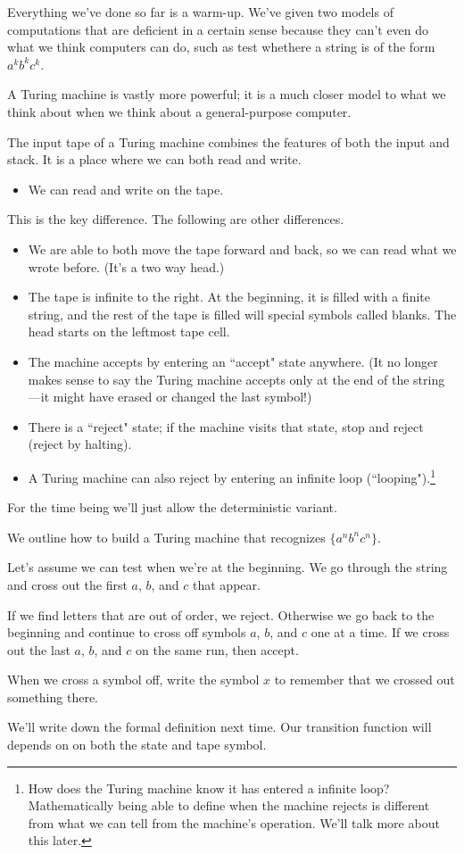 Everything we've done so far is a warm-up. We've given two models of computations that are deficient in a certain sense because they can't even do what we think computers can do, such as test whethere a string is of the form $a^kb^kc^k$.

A Turing machine is vastly more powerful; it is a much closer model to what we think about when we think about a general-purpose computer.

The input tape of a Turing machine combines the features of both the input and stack. It is a place where we can both read and write. 
\begin{itemize}
\item
We can read and write on the tape.
\end{itemize}
This is the key difference. The following are other differences.


\begin{itemize}
\item
We are able to both move the tape forward and back, so we can read what we wrote before. (It's a two way head.)
\item
The tape is infinite to the right. At the beginning, it is filled with a finite string, and the rest of the tape is filled will special symbols called blanks. The head starts on the leftmost tape cell.
\item The machine accepts by entering an ``accept" state anywhere. (It no longer makes sense to say the Turing machine accepts only at the end of the string---it might have erased or changed the last symbol!)
\item There is a ``reject" state; if the machine visits that state, stop and reject (reject by halting).
\item A Turing machine can also reject by entering an infinite loop (``looping").\footnote{How does the Turing machine know it has entered a infinite loop? Mathematically being able to define when the machine rejects is different from what we can tell from the machine's operation. We'll talk more about this later.}
\end{itemize}
For the time being we'll just allow the deterministic variant.

\begin{ex}
We outline how to build a Turing machine that recognizes $\{a^nb^nc^n\}$.

Let's assume we can test when we're at the beginning. We go through the  string and cross out the first $a$, $b$, and $c$ that appear.


If we find letters that are out of order, we reject. Otherwise we go back to the beginning and continue to cross off symbols $a$, $b$, and $c$ one at a time. If we cross out the last $a$, $b$, and $c$ on the same run, then accept.

When we cross a symbol off, write the symbol $x$ to remember that we crossed out something there. %
\end{ex}
We'll write down the formal definition next time. Our transition function will depends on on both the state and tape symbol.
